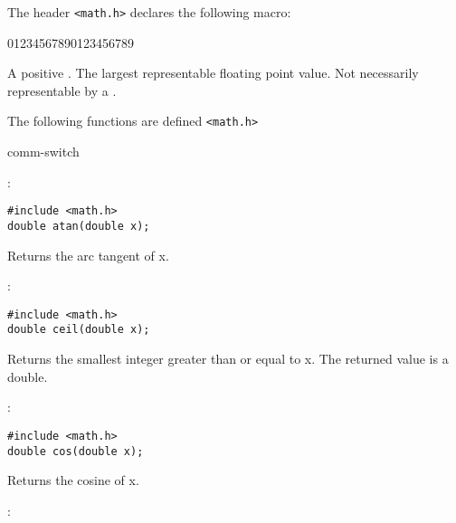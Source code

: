 The header \verb+<math.h>+ declares the following macro:


\begin{Ventry2}{01234567890123456789 }

\item[HUGE\_VAL]
\label{item:HUGEVAL}
	A positive . The largest representable floating point value.
	Not necessarily representable by a .

\end{Ventry2}



The following functions are defined \verb+<math.h>+

\begin{Ventry2}{comm-switch  }

\item[atan]
\label{item:atan}

:

\begin{production}
\begin{verbatim}
#include <math.h>
double atan(double x);
\end{verbatim}
\end{production}


Returns the arc tangent of x.

\item[ceil]
\label{item:ceil}
:

\begin{production}
\begin{verbatim}
#include <math.h>
double ceil(double x);
\end{verbatim}
\end{production}


Returns the smallest integer greater than or equal to x. The
returned value is a double.

\item[cos]
\label{item:cos}
:

\begin{production}
\begin{verbatim}
#include <math.h>
double cos(double x);
\end{verbatim}
\end{production}


Returns the cosine of x.

\item[cosh]
\label{item:cosh}
:


\end{Ventry2}
